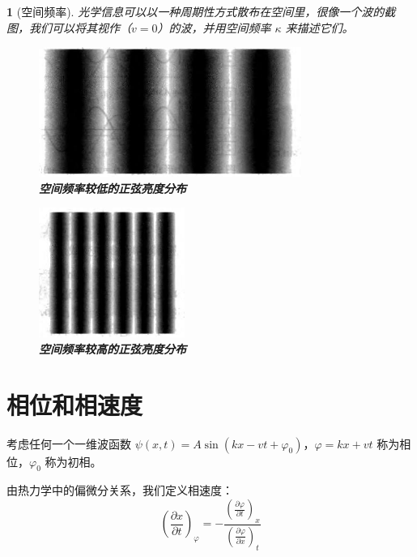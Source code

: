 \documentclass[UTF8]{report}
\theoremstyle{MyLineTheoremStyle} %
\theoremstyle{MyBlockTheoremStyle} %
\theoremstyle{MySubsubsectionStyle} %
\newtheorem{definition}{}
\begin{document}
\begin{definition}[空间频率]
光学信息可以以一种周期性方式散布在空间里，很像一个波的截图，我们可以将其视作（$v=0$）的波，并用空间频率 $\kappa$ 来描述它们。


\noindent\begin{minipage}{0.63\textwidth}
    \begin{figure}[H]\centering
    \includegraphics[height=120pt]{assets/image (41).jpg}
    \caption{\textbf{空间频率较低的正弦亮度分布}}\label{空间频率较低的正弦亮度分布}
    \end{figure}
    \end{minipage}
    \begin{minipage}{0.35\textwidth}
    \begin{figure}[H]\centering
    \includegraphics[height=120pt]{assets/image (42).jpg}
    \caption{\textbf{空间频率较高的正弦亮度分布}}\label{空间频率较高的正弦亮度分布}
    \end{figure}
\end{minipage}
\end{definition}

\section{相位和相速度}
考虑任何一个一维波函数 $\psi(x,t) = A \sin(kx-vt + \varphi_0)$，$\varphi = kx+vt$ 称为相位，$\varphi_0$ 称为初相。

由热力学中的偏微分关系，我们定义相速度：
\begin{equation}
    \left(\frac{\partial x }{\partial t }\right)_{\varphi} = -\frac{\left(\frac{\partial \varphi }{\partial t }\right)_{x}}{\left(\frac{\partial \varphi }{\partial x }\right)_{t}}
\end{equation}
\end{document}
